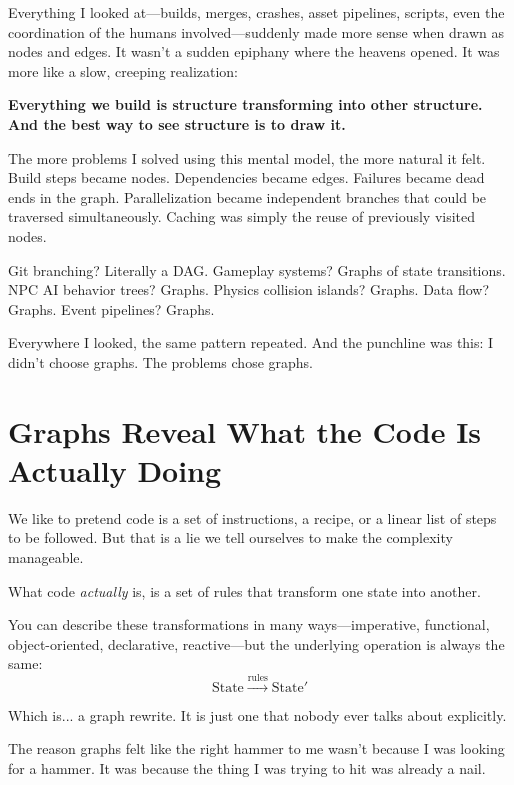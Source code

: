 Everything I looked at—builds, merges, crashes, asset pipelines, scripts, even the coordination of the humans involved—suddenly made more sense when drawn as nodes and edges. It wasn't a sudden epiphany where the heavens opened. It was more like a slow, creeping realization:

\textbf{Everything we build is structure transforming into other structure. And the best way to see structure is to draw it.}

The more problems I solved using this mental model, the more natural it felt. Build steps became nodes. Dependencies became edges. Failures became dead ends in the graph. Parallelization became independent branches that could be traversed simultaneously. Caching was simply the reuse of previously visited nodes.

Git branching? Literally a DAG. Gameplay systems? Graphs of state transitions. NPC AI behavior trees? Graphs. Physics collision islands? Graphs. Data flow? Graphs. Event pipelines? Graphs.

Everywhere I looked, the same pattern repeated. And the punchline was this: I didn't choose graphs. The problems chose graphs.

\section{Graphs Reveal What the Code Is Actually Doing}
\label{sec:graphs-reveal}

We like to pretend code is a set of instructions, a recipe, or a linear list of steps to be followed. But that is a lie we tell ourselves to make the complexity manageable. 

What code \textit{actually} is, is a set of rules that transform one state into another.

You can describe these transformations in many ways—imperative, functional, object-oriented, declarative, reactive—but the underlying operation is always the same:
\[
\text{State} \xrightarrow{\text{rules}} \text{State}'
\]

Which is... a graph rewrite. It is just one that nobody ever talks about explicitly.

The reason graphs felt like the right hammer to me wasn't because I was looking for a hammer. It was because the thing I was trying to hit was already a nail.

